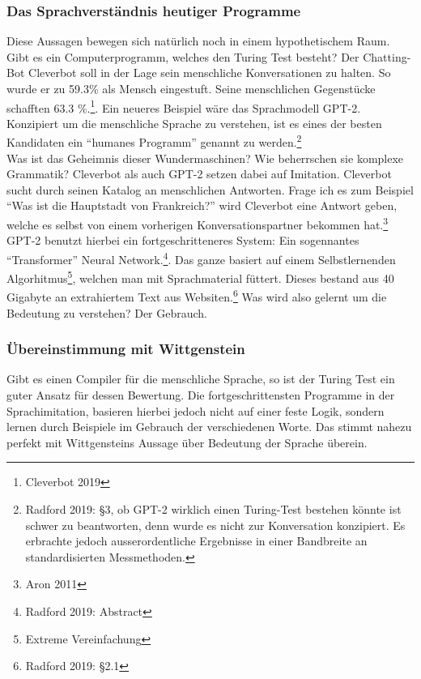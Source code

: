 \documentclass[a4paper,10pt]{article}
\begin{document}
\subsubsection{Das Sprachverständnis heutiger Programme}
Diese Aussagen bewegen sich natürlich noch in einem hypothetischem Raum. Gibt es ein Computerprogramm, welches den Turing Test besteht? Der Chatting-Bot Cleverbot soll in der Lage sein menschliche Konversationen zu halten. So wurde er zu 59.3\% als Mensch eingestuft. Seine menschlichen Gegenstücke schafften 63.3 \%.\footnote{Cleverbot 2019}. Ein neueres Beispiel wäre das Sprachmodell GPT-2. Konzipiert um die menschliche Sprache zu verstehen, ist es eines der besten Kandidaten ein \enquote{humanes Programm} genannt zu werden.\footnote{Radford 2019: §3, ob GPT-2 wirklich einen Turing-Test bestehen könnte ist schwer zu beantworten, denn wurde es nicht zur Konversation konzipiert. Es erbrachte jedoch ausserordentliche Ergebnisse in einer Bandbreite an standardisierten Messmethoden.} \\
Was ist das Geheimnis dieser Wundermaschinen? Wie beherrschen sie komplexe Grammatik? Cleverbot als auch GPT-2 setzen dabei auf Imitation. Cleverbot sucht durch seinen Katalog an menschlichen Antworten. Frage ich es zum Beispiel \enquote{Was ist die Hauptstadt von Frankreich?} wird Cleverbot eine Antwort geben, welche es selbst von einem vorherigen Konversationspartner bekommen hat.\footnote{Aron 2011} GPT-2 benutzt hierbei ein fortgeschritteneres System: Ein sogennantes \enquote{Transformer} Neural Network.\footnote{Radford 2019: Abstract}. Das ganze basiert auf einem Selbstlernenden Algorhitmus\footnote{Extreme Vereinfachung}, welchen man mit Sprachmaterial füttert. Dieses bestand aus 40 Gigabyte an extrahiertem Text aus Websiten.\footnote{Radford 2019: §2.1} Was wird also gelernt um die Bedeutung zu verstehen? Der Gebrauch.

\subsubsection{Übereinstimmung mit Wittgenstein}
Gibt es einen Compiler für die menschliche Sprache, so ist der Turing Test ein guter Ansatz für dessen Bewertung. Die fortgeschrittensten Programme in der Sprachimitation, basieren hierbei jedoch nicht auf einer feste Logik, sondern lernen durch Beispiele im Gebrauch der verschiedenen Worte. Das stimmt nahezu perfekt mit Wittgensteins Aussage über Bedeutung der Sprache überein. \\
\end{document}

